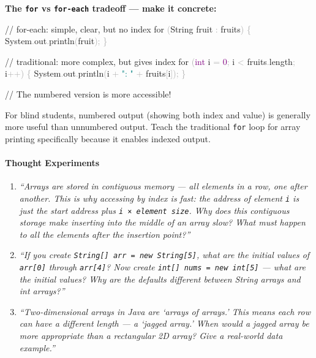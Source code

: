 \documentclass[
  justified,
  openright,
]{tufte-book}
\let\paragraph\paragraph
\newcommand{\BuiltInTok}[1]{#1}
\newcommand{\CommentTok}[1]{\textcolor{MidGray}{#1}}
\newcommand{\ControlFlowTok}[1]{\textcolor{BrandBlue}{#1}}
\newcommand{\DataTypeTok}[1]{\textcolor{Purple}{#1}}
\newcommand{\DecValTok}[1]{\textcolor{Purple}{#1}}
\newcommand{\FunctionTok}[1]{\textcolor{BrandBlue}{#1}}
\newcommand{\NormalTok}[1]{#1}
\newcommand{\OperatorTok}[1]{\textcolor{DarkGray}{#1}}
\newcommand{\StringTok}[1]{\textcolor{Teal}{#1}}
\newenvironment{Shaded}{%
  \begin{snugshade}
}{%
  \end{snugshade}
}
\let\paragraph\paragraph
\begin{document}
\textbf{The \texttt{for} vs \texttt{for-each} tradeoff --- make it
concrete:}

\begin{Shaded}
\begin{Highlighting}[]
\CommentTok{// for{-}each: simple, clear, but no index}
\ControlFlowTok{for} \OperatorTok{(}\BuiltInTok{String}\NormalTok{ fruit }\OperatorTok{:}\NormalTok{ fruits}\OperatorTok{)} \OperatorTok{\{}
    \BuiltInTok{System}\OperatorTok{.}\FunctionTok{out}\OperatorTok{.}\FunctionTok{println}\OperatorTok{(}\NormalTok{fruit}\OperatorTok{);}
\OperatorTok{\}}

\CommentTok{// traditional: more complex, but gives index}
\ControlFlowTok{for} \OperatorTok{(}\DataTypeTok{int}\NormalTok{ i }\OperatorTok{=} \DecValTok{0}\OperatorTok{;}\NormalTok{ i }\OperatorTok{\textless{}}\NormalTok{ fruits}\OperatorTok{.}\FunctionTok{length}\OperatorTok{;}\NormalTok{ i}\OperatorTok{++)} \OperatorTok{\{}
    \BuiltInTok{System}\OperatorTok{.}\FunctionTok{out}\OperatorTok{.}\FunctionTok{println}\OperatorTok{(}\NormalTok{i }\OperatorTok{+} \StringTok{": "} \OperatorTok{+}\NormalTok{ fruits}\OperatorTok{[}\NormalTok{i}\OperatorTok{]);}
\OperatorTok{\}}

\CommentTok{// The numbered version is more accessible!}
\end{Highlighting}
\end{Shaded}

For blind students, numbered output (showing both index and value) is
generally more useful than unnumbered output. Teach the traditional
\texttt{for} loop for array printing specifically because it enables
indexed output.

\paragraph{Thought Experiments}\label{thought-experiments-5}

\begin{enumerate}
\def\labelenumi{\arabic{enumi}.}
\item
  \emph{``Arrays are stored in contiguous memory --- all elements in a
  row, one after another. This is why accessing by index is fast: the
  address of element \texttt{i} is just the start address plus
  \texttt{i\ ×\ element\ size}. Why does this contiguous storage make
  inserting into the middle of an array slow? What must happen to all
  the elements after the insertion point?''}
\item
  \emph{``If you create
  \texttt{String{[}{]}\ arr\ =\ new\ String{[}5{]}}, what are the
  initial values of \texttt{arr{[}0{]}} through \texttt{arr{[}4{]}}? Now
  create \texttt{int{[}{]}\ nums\ =\ new\ int{[}5{]}} --- what are the
  initial values? Why are the defaults different between String arrays
  and int arrays?''}
\item
  \emph{``Two-dimensional arrays in Java are `arrays of arrays.' This
  means each row can have a different length --- a `jagged array.' When
  would a jagged array be more appropriate than a rectangular 2D array?
  Give a real-world data example.''}
\end{enumerate}
\end{document}
